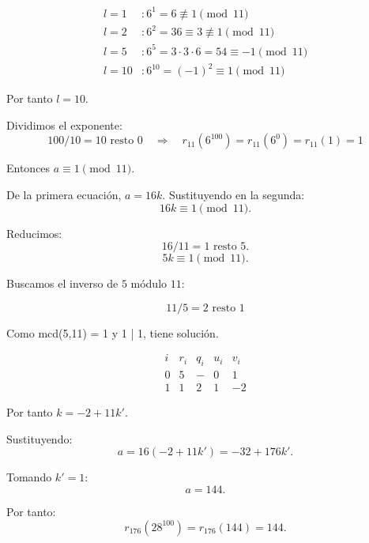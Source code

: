 \documentclass[a4paper,12pt]{article}
\begin{document}
\begin{ejercicio}[title=Ejercicio 28]

\[
\begin{aligned}
l=1 &: 6^1 = 6 \not\equiv 1 \pmod{11} \\
l=2 &: 6^2 = 36 \equiv 3 \not\equiv 1 \pmod{11} \\
l=5 &: 6^5 = 3 \cdot 3 \cdot 6 = 54 \equiv -1 \pmod{11} \\
l=10 &: 6^{10} = (-1)^2 \equiv 1 \pmod{11}
\end{aligned}
\]

Por tanto $l = 10$.

Dividimos el exponente:
\[
100 / 10 = 10 \text{ resto } 0 \quad \Rightarrow \quad r_{11}(6^{100}) = r_{11}(6^0) = r_{11}(1) = 1
\]

Entonces $a \equiv 1 \pmod{11}$.

De la primera ecuación, $a = 16k$.  
Sustituyendo en la segunda:
\[
16k \equiv 1 \pmod{11}.
\]

Reducimos:
\[
16 / 11 = 1 \text{ resto } 5.
\]
\[
5k \equiv 1 \pmod{11}.
\]

Buscamos el inverso de $5$ módulo $11$:

\[
11 / 5 = 2 \text{ resto } \boxed{1}
\]

Como mcd(5,11) = 1 y 1 | 1, tiene solución.

\[
\begin{array}{c|c|c|c|c}
i & r_i & q_i & u_i & v_i \\ \hline
0 & 5 & - & 0 & 1 \\
1 & \boxed{1} & 2 & 1 & -2
\end{array}
\]

Por tanto $k = -2 + 11k'$.

Sustituyendo:
\[
a = 16(-2 + 11k') = -32 + 176k'.
\]

Tomando $k' = 1$:
\[
a = 144.
\]

Por tanto:
\[
r_{176}(28^{100}) = r_{176}(144) = \boxed{144}.
\]
\end{ejercicio}
\end{document}
